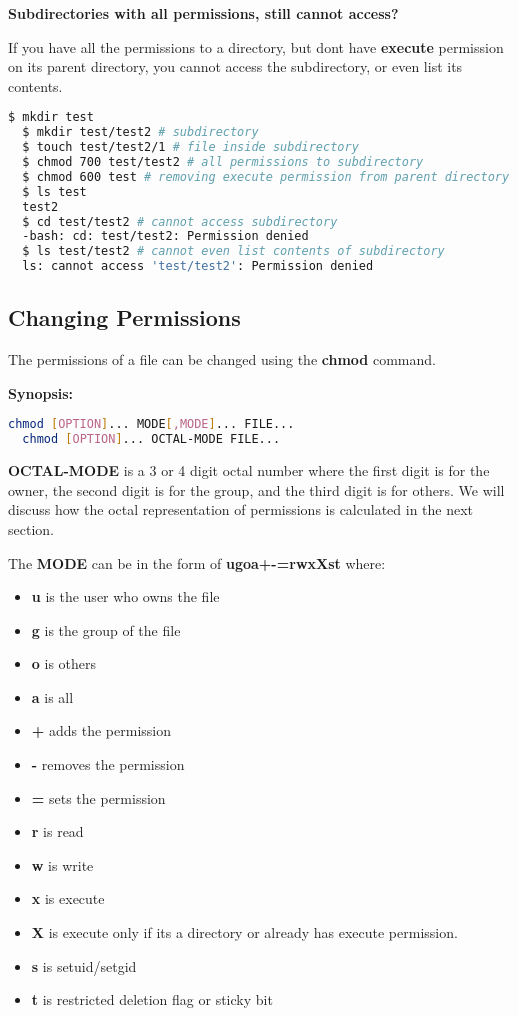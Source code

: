 \textbf{Subdirectories with all permissions, still cannot access?}

If you have all the permissions to a directory, but dont have
\textbf{execute} permission on its parent directory,
you cannot access the subdirectory, or even list its contents.

\begin{lstlisting}[language=bash]
  $ mkdir test
  $ mkdir test/test2 # subdirectory
  $ touch test/test2/1 # file inside subdirectory
  $ chmod 700 test/test2 # all permissions to subdirectory
  $ chmod 600 test # removing execute permission from parent directory
  $ ls test
  test2
  $ cd test/test2 # cannot access subdirectory
  -bash: cd: test/test2: Permission denied
  $ ls test/test2 # cannot even list contents of subdirectory
  ls: cannot access 'test/test2': Permission denied
\end{lstlisting}

\subsection{Changing Permissions}

The permissions of a file can be changed using the \textbf{chmod} command.

\textbf{Synopsis:}

\begin{lstlisting}[language=bash]
  chmod [OPTION]... MODE[,MODE]... FILE...
  chmod [OPTION]... OCTAL-MODE FILE...
\end{lstlisting}

\textbf{OCTAL-MODE} is a 3 or 4 digit octal number where the first digit is for the owner, the second digit is for the group, and the third digit is for others.
We will discuss how the octal representation of permissions is calculated in the next section.

The \textbf{MODE} can be in the form of \textbf{ugoa+-=rwxXst} where:

\begin{itemize}
  \item \textbf{u} is the user who owns the file
  \item \textbf{g} is the group of the file
  \item \textbf{o} is others
  \item \textbf{a} is all
  \item \textbf{+} adds the permission
  \item \textbf{-} removes the permission
  \item \textbf{={}} sets the permission
  \item \textbf{r} is read
  \item \textbf{w} is write
  \item \textbf{x} is execute
  \item \textbf{X} is execute only if its a directory or already has execute permission.
  \item \textbf{s} is setuid/setgid
  \item \textbf{t} is restricted deletion flag or sticky bit
\end{itemize}

